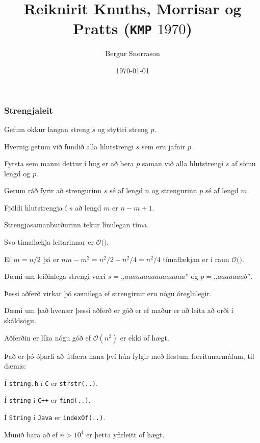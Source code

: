 \title{Reiknirit Knuths, Morrisar og Pratts (\texttt{KMP} $1970$)}
\author{Bergur Snorrason}
\date{\today}



\frame{\titlepage}

{
	\frametitle{Strengjaleit}
	{
		\item<1-> Gefum okkur langan streng $s$ og styttri streng $p$.
		\item<2-> Hvernig getum við fundið alla hlutstrengi $s$ sem eru jafnir $p$.
		\item<3-> Fyrsta sem manni dettur í hug er að bera $p$ saman við alla hlutstrengi $s$ af sömu lengd og $p$.
	}
}

{
}

{
	{
		\item<1-> Gerum ráð fyrir að strengurinn $s$ sé af lengd $n$ og strengurinn $p$ sé af lengd $m$.
		\item<2-> Fjöldi hlutstrengja í $s$ að lengd $m$ er $n - m + 1$.
		\item<3-> Strengjasamanburðurinn tekur línulegan tíma.
		\item<4-> Svo tímaflækja leitarinnar er $\mathcal{O}($\onslide<5->{$nm - m^2$}$)$.
		\item<6-> Ef $m = n/2$ þá er $nm - m^2 = n^2/2 - n^2/4 = n^2/4$ tímaflækjan er í raun $\mathcal{O}($\onslide<7->{$n^2$}$)$.
		\item<8-> Dæmi um leiðinlega strengi væri $s = \text{,,}aaaaaaaaaaaaaaaa\text{''}$ og $p = \text{,,}aaaaaaab\text{''}$.
		\item<9-> Þessi aðferð virkar þó sæmilega ef strengirnir eru nógu óreglulegir.
		\item<10-> Dæmi um það hvenær þessi aðferð er góð er ef maður er að leita að orði í skáldsögu.
	}
}

{
	{
		\item<1-> Aðferðin er líka nógu góð ef $\mathcal{O}(n^2)$ er ekki of hægt.
		\item<2-> Það er þó óþarfi að útfæra hana því hún fylgir með flestum forritunarmálum, til dæmis:
		{
			\item<3-> Í \texttt{string.h} í \texttt{C} er \texttt{strstr(..)}.
			\item<4-> Í \texttt{string} í \texttt{C++} er \texttt{find(..)}.
			\item<5-> Í \texttt{String} í \texttt{Java} er \texttt{indexOf(..)}.
		}
		\item<6-> Munið bara að ef $n > 10^4$ er þetta yfirleitt of hægt.
	}
}

